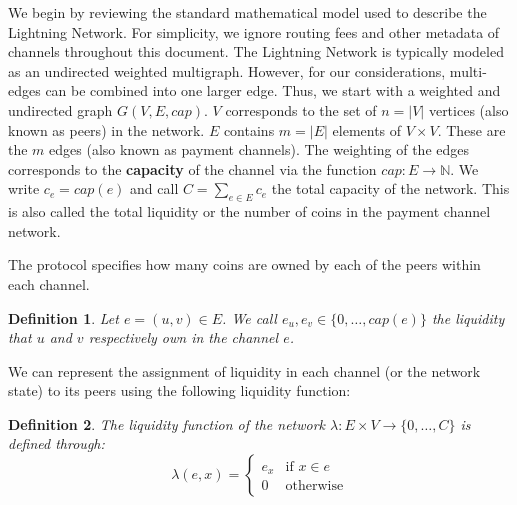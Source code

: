 \documentclass[10pt,twocolumn]{article}
\newtheorem{definition}{Definition}[section]
\begin{document}

We begin by reviewing the standard mathematical model used to describe the Lightning Network.
For simplicity, we ignore routing fees and other metadata of channels throughout this document.
The Lightning Network is typically modeled as an undirected weighted multigraph.
However, for our considerations, multi-edges can be combined into one larger edge.
Thus, we start with a weighted and undirected graph \(G(V,E,cap)\).
\(V\) corresponds to the set of \(n = |V|\) vertices (also known as peers) in the network.
\(E\) contains \(m = |E|\) elements of \(V \times V\).
These are the \(m\) edges (also known as payment channels).
The weighting of the edges corresponds to the \textbf{capacity} of the channel via the function \(cap: E \longrightarrow \mathbb{N}\).
We write \(c_e = cap(e)\) and call \(C = \sum_{e \in E} c_e\) the total capacity of the network.
This is also called the total liquidity or the number of coins in the payment channel network.

The protocol specifies how many coins are owned by each of the peers within each channel.
\begin{definition}
  Let \(e = (u, v) \in E\). 
  We call \(e_u, e_v \in \{0, \dots, cap(e)\}\) the liquidity that \(u\) and \(v\) respectively own in the channel \(e\).
\end{definition}

We can represent the assignment of liquidity in each channel (or the network state) to its peers using the following liquidity function:
\begin{definition}
  \label{def:liquidityFunction}
  The liquidity function of the network $\lambda: E\times V \longrightarrow \{0,\dots,C\}$ is defined through:
    \begin{equation}
    \lambda(e,x)= \begin{cases}
      e_x & \text{if $x\in e$}\\
      0 & \text{otherwise}
    \end{cases}
    \end{equation}
\end{definition}
\end{document}
